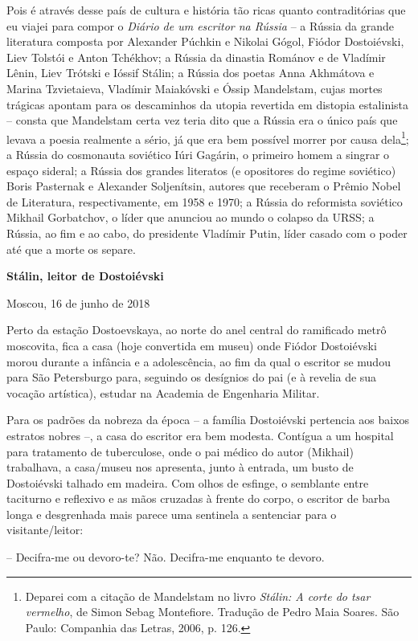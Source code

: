 Pois é através desse país de cultura e história tão ricas quanto
contraditórias que eu viajei para compor o \emph{Diário de um escritor
na Rússia} -- a Rússia da grande literatura composta por Alexander
Púchkin e Nikolai Gógol, Fiódor Dostoiévski, Liev Tolstói e Anton
Tchékhov; a Rússia da dinastia Románov e de Vladímir Lênin, Liev Trótski
e Ióssif Stálin; a Rússia dos poetas Anna Akhmátova e Marina
Tzvietaieva, Vladímir Maiakóvski e Óssip Mandelstam, cujas mortes
trágicas apontam para os descaminhos da utopia revertida em distopia
estalinista -- consta que Mandelstam certa vez teria dito que a Rússia
era o único país que levava a poesia realmente a sério, já que era bem
possível morrer por causa dela\footnote{Deparei com a citação de
  Mandelstam no livro \emph{Stálin: A corte do tsar vermelho}, de Simon
  Sebag Montefiore. Tradução de Pedro Maia Soares. São Paulo: Companhia
  das Letras, 2006, p. 126.}; a Rússia do cosmonauta soviético Iúri
Gagárin, o primeiro homem a singrar o espaço sideral; a Rússia dos
grandes literatos (e opositores do regime soviético) Boris Pasternak e
Alexander Soljenítsin, autores que receberam o Prêmio Nobel de
Literatura, respectivamente, em 1958 e 1970; a Rússia do reformista
soviético Mikhail Gorbatchov, o líder que anunciou ao mundo o colapso da
URSS; a Rússia, ao fim e ao cabo, do presidente Vladímir Putin, líder
casado com o poder até que a morte os separe.

\textbf{Stálin, leitor de Dostoiévski}

Moscou, 16 de junho de 2018

Perto da estação Dostoevskaya, ao norte do anel central do ramificado
metrô moscovita, fica a casa (hoje convertida em museu) onde Fiódor
Dostoiévski morou durante a infância e a adolescência, ao fim da qual o
escritor se mudou para São Petersburgo para, seguindo os desígnios do
pai (e à revelia de sua vocação artística), estudar na Academia de
Engenharia Militar.

Para os padrões da nobreza da época -- a família Dostoiévski pertencia
aos baixos estratos nobres --, a casa do escritor era bem modesta.
Contígua a um hospital para tratamento de tuberculose, onde o pai médico
do autor (Mikhail) trabalhava, a casa/museu nos apresenta, junto à
entrada, um busto de Dostoiévski talhado em madeira. Com olhos de
esfinge, o semblante entre taciturno e reflexivo e as mãos cruzadas à
frente do corpo, o escritor de barba longa e desgrenhada mais parece uma
sentinela a sentenciar para o visitante/leitor:

-- Decifra-me ou devoro-te? Não. Decifra-me enquanto te devoro.

